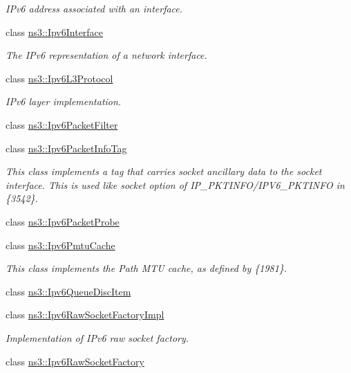 \begin{DoxyCompactItemize}
\begin{DoxyCompactList}\small\item\em I\+Pv6 address associated with an interface. \end{DoxyCompactList}\item 
class \hyperlink{classns3_1_1Ipv6Interface}{ns3\+::\+Ipv6\+Interface}
\begin{DoxyCompactList}\small\item\em The I\+Pv6 representation of a network interface. \end{DoxyCompactList}\item 
class \hyperlink{classns3_1_1Ipv6L3Protocol}{ns3\+::\+Ipv6\+L3\+Protocol}
\begin{DoxyCompactList}\small\item\em I\+Pv6 layer implementation. \end{DoxyCompactList}\item 
class \hyperlink{classns3_1_1Ipv6PacketFilter}{ns3\+::\+Ipv6\+Packet\+Filter}
\item 
class \hyperlink{classns3_1_1Ipv6PacketInfoTag}{ns3\+::\+Ipv6\+Packet\+Info\+Tag}
\begin{DoxyCompactList}\small\item\em This class implements a tag that carries socket ancillary data to the socket interface. This is used like socket option of I\+P\+\_\+\+P\+K\+T\+I\+N\+F\+O/\+I\+P\+V6\+\_\+\+P\+K\+T\+I\+N\+FO in \{3542\}. \end{DoxyCompactList}\item 
class \hyperlink{classns3_1_1Ipv6PacketProbe}{ns3\+::\+Ipv6\+Packet\+Probe}
\item 
class \hyperlink{classns3_1_1Ipv6PmtuCache}{ns3\+::\+Ipv6\+Pmtu\+Cache}
\begin{DoxyCompactList}\small\item\em This class implements the Path M\+TU cache, as defined by \{1981\}. \end{DoxyCompactList}\item 
class \hyperlink{classns3_1_1Ipv6QueueDiscItem}{ns3\+::\+Ipv6\+Queue\+Disc\+Item}
\item 
class \hyperlink{classns3_1_1Ipv6RawSocketFactoryImpl}{ns3\+::\+Ipv6\+Raw\+Socket\+Factory\+Impl}
\begin{DoxyCompactList}\small\item\em Implementation of I\+Pv6 raw socket factory. \end{DoxyCompactList}\item 
class \hyperlink{classns3_1_1Ipv6RawSocketFactory}{ns3\+::\+Ipv6\+Raw\+Socket\+Factory}

\end{DoxyCompactItemize}

